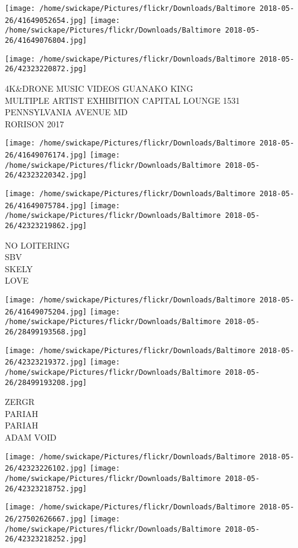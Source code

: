 \documentclass[10pt,letterpaper]{article}
\begin{document}
\texttt{[image: /home/swickape/Pictures/flickr/Downloads/Baltimore 2018-05-26/41649052654.jpg]}
\texttt{[image: /home/swickape/Pictures/flickr/Downloads/Baltimore 2018-05-26/41649076804.jpg]}

\vspace{0.25in}
\texttt{[image: /home/swickape/Pictures/flickr/Downloads/Baltimore 2018-05-26/42323220872.jpg]}

4K\&DRONE MUSIC VIDEOS GUANAKO KING\\
MULTIPLE ARTIST EXHIBITION CAPITAL LOUNGE 1531 PENNSYLVANIA AVENUE MD\\
RORISON 2017
\pagebreak

\texttt{[image: /home/swickape/Pictures/flickr/Downloads/Baltimore 2018-05-26/41649076174.jpg]}
\texttt{[image: /home/swickape/Pictures/flickr/Downloads/Baltimore 2018-05-26/42323220342.jpg]}

\texttt{[image: /home/swickape/Pictures/flickr/Downloads/Baltimore 2018-05-26/41649075784.jpg]}
\texttt{[image: /home/swickape/Pictures/flickr/Downloads/Baltimore 2018-05-26/42323219862.jpg]}

NO LOITERING\\
SBV\\
SKELY\\
LOVE
\pagebreak

\texttt{[image: /home/swickape/Pictures/flickr/Downloads/Baltimore 2018-05-26/41649075204.jpg]}
\texttt{[image: /home/swickape/Pictures/flickr/Downloads/Baltimore 2018-05-26/28499193568.jpg]}

\texttt{[image: /home/swickape/Pictures/flickr/Downloads/Baltimore 2018-05-26/42323219372.jpg]}
\texttt{[image: /home/swickape/Pictures/flickr/Downloads/Baltimore 2018-05-26/28499193208.jpg]}

ZERGR\\
PARIAH\\
PARIAH\\
ADAM VOID
\pagebreak

\texttt{[image: /home/swickape/Pictures/flickr/Downloads/Baltimore 2018-05-26/42323226102.jpg]}
\texttt{[image: /home/swickape/Pictures/flickr/Downloads/Baltimore 2018-05-26/42323218752.jpg]}

\texttt{[image: /home/swickape/Pictures/flickr/Downloads/Baltimore 2018-05-26/27502626667.jpg]}
\texttt{[image: /home/swickape/Pictures/flickr/Downloads/Baltimore 2018-05-26/42323218252.jpg]}
\end{document}

